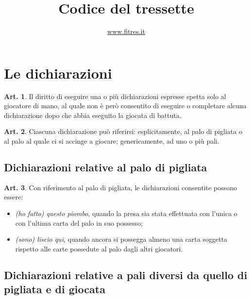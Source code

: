 \documentclass[italian,a4paper]{article}
\title{Codice del tressette}
\author{\url{www.fitres.it}}
\date{}
\theoremstyle{definition}
\newtheorem{art}{Art.}
\begin{document}
\maketitle
\section*{Le dichiarazioni}

\setcounter{art}{35}
\begin{art}
Il diritto di eseguire una o più dichiarazioni espresse spetta solo al
giocatore di mano, al quale non è però consentito di eseguire o completare
alcuna dichiarazione dopo che abbia eseguito la giocata di battuta.
\end{art}

\begin{art}
Ciascuna dichiarazione può riferirsi: esplicitamente, al palo di pigliata o
al palo al quale ci si accinge a giocare;  genericamente, ad uno o più pali.
\end{art}

\subsection*{Dichiarazioni relative al palo di pigliata}

\begin{art}
Con riferimento al palo di pigliata, le dichiarazioni consentite possono
essere:
\begin{itemize}
    \item \emph{(ho fatto) questo piombo}, quando la presa sia stata effettuata
con l’unica o con l’ultima carta del palo in suo possesso;
    \item \emph{(sono) liscio qui}, quando ancora si possegga almeno una carta
soggetta rispetto alle carte possedute al palo dagli altri giocatori.
\end{itemize}
\end{art}

\subsection*{Dichiarazioni relative a pali diversi da quello di pigliata e di giocata}
\end{document}

